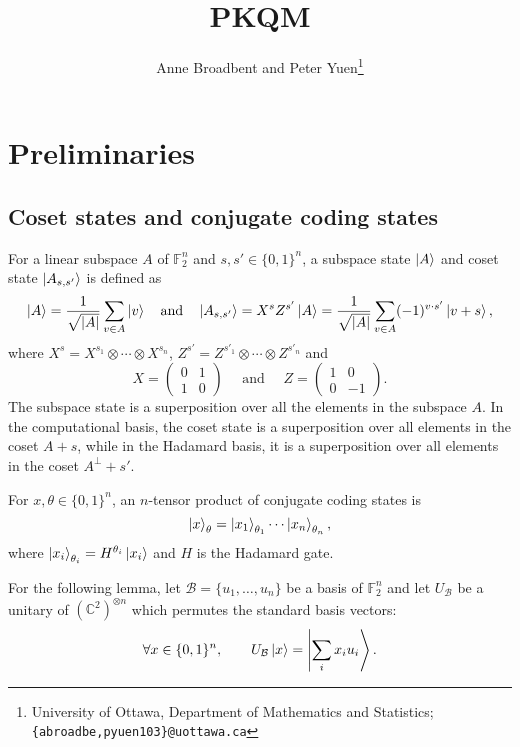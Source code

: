 \documentclass[12pt,letterpaper]{article}
\title{
PKQM}
\author{Anne Broadbent and Peter Yuen\footnote{University of Ottawa, Department of Mathematics and Statistics; \texttt{\{abroadbe,pyuen103\}@uottawa.ca}}}
\date{}
\theoremstyle{definition}
\theoremstyle{remark}
\begin{document}
\maketitle

\section{Preliminaries}

\subsection{Coset states and conjugate coding states}
\label{Coset states and conjugate coding states}
For a linear subspace $A$ of $\mathbb{F}^n_2$ and $s,s' \in \{0,1\}^n$, a subspace state $\ket{A}$ and coset state $\ket{A_{s,s'}}$ is defined as
\begin{equation}
    \ket{A} = \frac{1}{\sqrt{|A|}}\sum_{v\in A} \ket{v} \quad 
    \text{and} \quad \ket{A_{s,s'}} = X^s Z^{s'} \ket{A} = \frac{1}{\sqrt{|A|}} \sum_{v \in A} (-1)^{v \cdot s'} \ket{v+s},
\end{equation}
where $X^s=X^{s_1} \otimes \cdots \otimes X^{s_n}$, $Z^{s'} = Z^{s'_1} \otimes \cdots \otimes Z^{s'_n}$ and
\begin{equation*}
    X =
    \begin{pmatrix}
    0 & 1\\
    1 & 0
    \end{pmatrix}
    \quad \text{ and } \quad
    Z =
    \begin{pmatrix}
    1 & 0\\
    0 & -1
    \end{pmatrix}.
\end{equation*}
The subspace state is a superposition over all the elements in the subspace $A$. In the computational basis, the coset state is a superposition over all elements in the coset $A+s$, while in the Hadamard basis, it is a superposition over all elements in the coset $A^\perp+s'$. 

For $x, \theta \in \{0,1\}^n$, an $n$-tensor product of conjugate coding states is
\begin{equation}
    \ket{x}_{\theta} = \ket{x_1}_{\theta_1} \cdots \ket{x_n}_{\theta_n},
\end{equation}
where $\ket{x_i}_{\theta_i} = H^{\theta_i}\ket{x_i}$ and $H$ is the Hadamard gate.

For the following lemma, let $\mathcal{B}=\{u_1, \ldots, u_n\}$ be a basis of $\mathbb{F}^n_2$ and let $U_\mathcal{B}$ be a unitary of $(\mathbb{C}^2)^{\otimes n}$ which permutes the standard basis vectors:
\begin{equation}
\label{permuteBasis}
    \forall x \in \{0,1\}^n, \quad \quad U_\mathcal{B}\ket{x} = \Ket{\sum_i x_i u_i}.
\end{equation}
\end{document}
